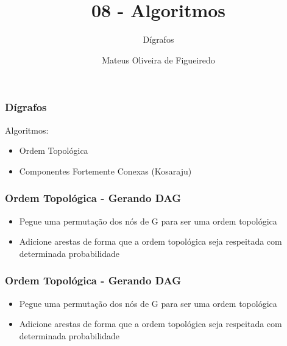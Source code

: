 \documentclass[aspectratio=169,usenames,dvipsnames]{beamer}
\title{08 - Algoritmos}
\subtitle{Dígrafos}
\author{Mateus Oliveira de Figueiredo}
\date{}
\begin{document}
\begin{frame}
\titlepage
\end{frame}

\begin{frame}
\frametitle{Dígrafos}
\vfill
Algoritmos:
\begin{itemize}
  \item Ordem Topológica
  \item Componentes Fortemente Conexas (Kosaraju)
\end{itemize}
\vfill
\end{frame}

\begin{frame}
  \frametitle{Ordem Topológica - Gerando DAG}

  \begin{itemize}
    \item Pegue uma permutação dos nós de G para ser uma ordem topológica
    \item Adicione arestas de forma que a ordem topológica seja respeitada com determinada probabilidade
  \end{itemize}
\end{frame}

  \begin{frame}
    \frametitle{Ordem Topológica - Gerando DAG}

    \begin{itemize}
      \item Pegue uma permutação dos nós de G para ser uma ordem topológica
      \item<2> Adicione arestas de forma que a ordem topológica seja respeitada com determinada probabilidade
    \end{itemize}

    \vfill

    \begin{center}
    \end{center}

    \vfill

\end{frame}
\end{document}
